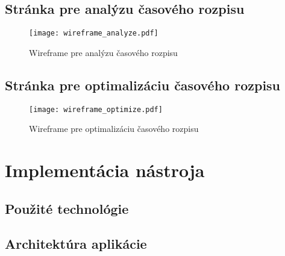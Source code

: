 \subsection*{Stránka pre analýzu časového rozpisu}

\begin{figure}[h]
  \centering
  \texttt{[image: wireframe\_analyze.pdf]}
  \caption{Wireframe pre analýzu časového rozpisu}
  \label{fig:wireframe_analyze}
\end{figure}

\subsection*{Stránka pre optimalizáciu časového rozpisu}

\begin{figure}[h]
  \centering
  \texttt{[image: wireframe\_optimize.pdf]}
  \caption{Wireframe pre optimalizáciu časového rozpisu}
  \label{fig:wireframe_optimize}
\end{figure}

\section{Implementácia nástroja}
\label{nastroj_implementacia}

\subsection*{Použité technológie}

\subsection*{Architektúra aplikácie}















































